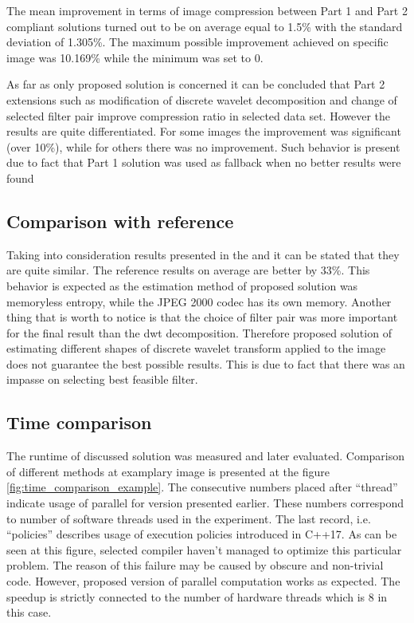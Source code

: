 The mean improvement in terms of image compression between Part 1 and Part 2 compliant solutions
turned out to be on average equal to 1.5\% with the standard deviation of 1.305\%. The maximum
possible improvement achieved on specific image was 10.169\% while the minimum was set to 0.

As far as only proposed solution is concerned it can be concluded that Part 2 extensions such as modification
of discrete wavelet decomposition and change of selected filter pair improve compression ratio
in selected data set. However the results are quite differentiated. For some images the improvement
was significant (over 10\%), while for others there was no improvement. Such behavior is present
due to fact that Part 1 solution was used as fallback when no better results were found


\subsection{Comparison with reference} \label{sec:results_comparison}

Taking into consideration results presented in the  and 
it can be stated that they are quite similar. The reference results on average are better by 33\%.
This behavior is expected as the estimation method of proposed solution was memoryless entropy,
while the JPEG 2000 codec has its own memory. Another thing that is worth to notice is that the
choice of filter pair was more important for the final result than the dwt decomposition.
Therefore proposed solution of estimating different shapes of discrete wavelet transform applied
to the image does not guarantee the best possible results. This is due to fact that there was
an impasse on selecting best feasible filter.

\subsection{Time comparison} \label{sec:time_results}

The runtime of discussed solution was measured and later evaluated. Comparison of different
methods at examplary image is presented at the figure \ref{fig:time_comparison_example}. The consecutive
numbers placed after ``thread'' indicate usage of parallel for version presented earlier.
These numbers correspond to number of software threads used in the experiment. The last record, i.e.
``policies'' describes usage of execution policies introduced in C++17. As can be seen at this
figure, selected compiler haven't managed to optimize this particular problem. The reason of
this failure may be caused by obscure and non-trivial code. However, proposed version of parallel
computation works as expected. The speedup is strictly connected to the number of hardware threads
which is 8 in this case.

